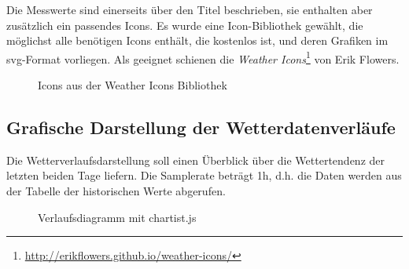 \noindent
Die Messwerte sind einerseits über den Titel beschrieben, sie enthalten aber zusätzlich ein passendes Icons. Es wurde eine Icon-Bibliothek gewählt, die möglichst alle benötigen Icons enthält, die kostenlos ist, und deren Grafiken im svg-Format vorliegen. Als geeignet schienen die \textit{Weather Icons}\footnote{\url{http://erikflowers.github.io/weather-icons/}} von Erik Flowers.


\begin{figure}[h!]
	\centering
	\caption{Icons aus der Weather Icons Bibliothek}
	\label{img:icons}
\end{figure}





\subsection{Grafische Darstellung der Wetterdatenverläufe}
Die Wetterverlaufsdarstellung soll einen Überblick über die Wettertendenz der letzten beiden Tage liefern. Die Samplerate beträgt 1h, d.h. die Daten werden aus der Tabelle der historischen Werte abgerufen.

\begin{figure}[h!]
	\centering
	\caption{Verlaufsdiagramm mit chartist.js}
	\label{img:charts}
\end{figure}



